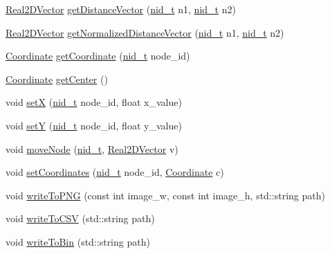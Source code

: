 \begin{DoxyCompactItemize}
\item 
\mbox{\hyperlink{classRPGraph_1_1Real2DVector}{Real2\+D\+Vector}} \mbox{\hyperlink{classRPGraph_1_1GraphLayout_af90cdf14a0bfea5e6854ba1b2b885761}{get\+Distance\+Vector}} (\mbox{\hyperlink{namespaceRPGraph_ab3ae34f1ab88e48f43794c30c8697b74}{nid\+\_\+t}} n1, \mbox{\hyperlink{namespaceRPGraph_ab3ae34f1ab88e48f43794c30c8697b74}{nid\+\_\+t}} n2)
\item 
\mbox{\hyperlink{classRPGraph_1_1Real2DVector}{Real2\+D\+Vector}} \mbox{\hyperlink{classRPGraph_1_1GraphLayout_a3e3e2ba138f5b416a32f52d957926da5}{get\+Normalized\+Distance\+Vector}} (\mbox{\hyperlink{namespaceRPGraph_ab3ae34f1ab88e48f43794c30c8697b74}{nid\+\_\+t}} n1, \mbox{\hyperlink{namespaceRPGraph_ab3ae34f1ab88e48f43794c30c8697b74}{nid\+\_\+t}} n2)
\item 
\mbox{\hyperlink{classRPGraph_1_1Coordinate}{Coordinate}} \mbox{\hyperlink{classRPGraph_1_1GraphLayout_a069b03de122b6dd8e7518db18d7615c9}{get\+Coordinate}} (\mbox{\hyperlink{namespaceRPGraph_ab3ae34f1ab88e48f43794c30c8697b74}{nid\+\_\+t}} node\+\_\+id)
\item 
\mbox{\hyperlink{classRPGraph_1_1Coordinate}{Coordinate}} \mbox{\hyperlink{classRPGraph_1_1GraphLayout_aa9a3cfeb1f895fce3c9b352200251d5f}{get\+Center}} ()
\item 
void \mbox{\hyperlink{classRPGraph_1_1GraphLayout_a870e6ad8d7e2dab189cb591dead19414}{setX}} (\mbox{\hyperlink{namespaceRPGraph_ab3ae34f1ab88e48f43794c30c8697b74}{nid\+\_\+t}} node\+\_\+id, float x\+\_\+value)
\item 
void \mbox{\hyperlink{classRPGraph_1_1GraphLayout_a55203ccaaba03d4dd739c2e6552be90e}{setY}} (\mbox{\hyperlink{namespaceRPGraph_ab3ae34f1ab88e48f43794c30c8697b74}{nid\+\_\+t}} node\+\_\+id, float y\+\_\+value)
\item 
void \mbox{\hyperlink{classRPGraph_1_1GraphLayout_a00198f453c2216d63e3afcbf8eed0122}{move\+Node}} (\mbox{\hyperlink{namespaceRPGraph_ab3ae34f1ab88e48f43794c30c8697b74}{nid\+\_\+t}}, \mbox{\hyperlink{classRPGraph_1_1Real2DVector}{Real2\+D\+Vector}} v)
\item 
void \mbox{\hyperlink{classRPGraph_1_1GraphLayout_a99ad68f3edff2c5f0a78a4db3e2f15ea}{set\+Coordinates}} (\mbox{\hyperlink{namespaceRPGraph_ab3ae34f1ab88e48f43794c30c8697b74}{nid\+\_\+t}} node\+\_\+id, \mbox{\hyperlink{classRPGraph_1_1Coordinate}{Coordinate}} c)
\item 
void \mbox{\hyperlink{classRPGraph_1_1GraphLayout_ab5892ee9d2eba41d1f285f0e480d00e2}{write\+To\+P\+NG}} (const int image\+\_\+w, const int image\+\_\+h, std\+::string path)
\item 
void \mbox{\hyperlink{classRPGraph_1_1GraphLayout_ae01b3ad2b348683c2e55d49496c32800}{write\+To\+C\+SV}} (std\+::string path)
\item 
void \mbox{\hyperlink{classRPGraph_1_1GraphLayout_a19fb67898bdb294ac46fb098ec2b0bad}{write\+To\+Bin}} (std\+::string path)
\end{DoxyCompactItemize}
